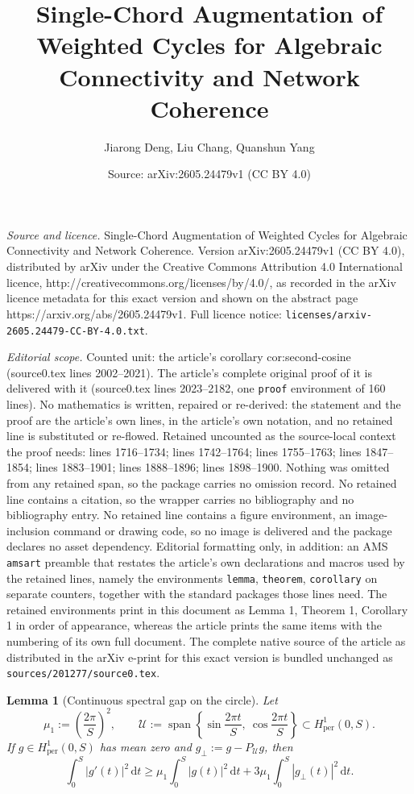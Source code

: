 \documentclass[10pt,a4paper]{amsart}
\title{Single-Chord Augmentation of Weighted Cycles for Algebraic Connectivity and Network Coherence}
\author{Jiarong Deng, Liu Chang, Quanshun Yang}
\date{Source: arXiv:2605.24479v1 (CC BY 4.0)}
\newtheorem{lemma}{Lemma}
\begin{document}
\maketitle

\noindent\emph{Source and licence.} Single-Chord Augmentation of Weighted Cycles for Algebraic Connectivity and Network Coherence. Version arXiv:2605.24479v1 (CC BY 4.0), distributed by arXiv under the Creative Commons Attribution 4.0 International licence, http://creativecommons.org/licenses/by/4.0/, as recorded in the arXiv licence metadata for this exact version and shown on the abstract page https://arxiv.org/abs/2605.24479v1. Full licence notice: \texttt{licenses/arxiv-2605.24479-CC-BY-4.0.txt}.\par\smallskip

\noindent\textit{Editorial scope.} Counted unit: the article's corollary cor:second-cosine (source0.tex lines 2002--2021). The article's complete original proof of it is delivered with it (source0.tex lines 2023--2182, one \texttt{proof} environment of 160 lines). No mathematics is written, repaired or re-derived: the statement and the proof are the article's own lines, in the article's own notation, and no retained line is substituted or re-flowed.  Retained uncounted as the source-local context the proof needs: lines 1716--1734; lines 1742--1764; lines 1755--1763; lines 1847--1854; lines 1883--1901; lines 1888--1896; lines 1898--1900.  Nothing was omitted from any retained span, so the package carries no omission record.  No retained line contains a citation, so the wrapper carries no bibliography and no bibliography entry.  No retained line contains a figure environment, an image-inclusion command or drawing code, so no image is delivered and the package declares no asset dependency.  Editorial formatting only, in addition: an AMS \texttt{amsart} preamble that restates the article's own declarations and macros used by the retained lines, namely the environments \texttt{lemma}, \texttt{theorem}, \texttt{corollary} on separate counters, together with the standard packages those lines need.  The retained environments print in this document as Lemma 1, Theorem 1, Corollary 1 in order of appearance, whereas the article prints the same items with the numbering of its own full document.  The complete native source of the article as distributed in the arXiv e-print for this exact version is bundled unchanged as \texttt{sources/201277/source0.tex}.
\begin{lemma}[Continuous spectral gap on the circle]\label{lem:circle_gap_disc}
	Let
	\[
	\mu_1:=\left(\frac{2\pi}{S}\right)^2,
	\qquad
	\mathcal U:=\operatorname{span}\left\{
	\sin\frac{2\pi t}{S},\ \cos\frac{2\pi t}{S}
	\right\}\subset H^1_{\mathrm{per}}(0,S).
	\]
	If $g\in H^1_{\mathrm{per}}(0,S)$ has mean zero and
	$g_\perp:=g-P_{\mathcal U}g$, then
	\begin{equation}\label{eq:circle_gap_disc}
		\int_0^S|g'(t)|^2\,\mathrm dt
		\ge
		\mu_1\int_0^S|g(t)|^2\,\mathrm dt
		+
		3\mu_1\int_0^S|g_\perp(t)|^2\,\mathrm dt.
	\end{equation}
\end{lemma}
\end{document}
